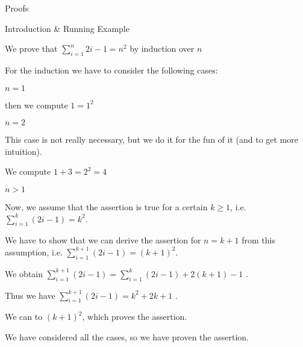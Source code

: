 \begin{sfragment}{Proofs}
\begin{sfragment}{Introduction \& Running Example}
\begin{mdframed}
  \begin{sproof}[id=simple-proof]
  {We prove that $\sum_{i=1}^n{2i-1}=n^{2}$ by induction over $n$}
  \begin{spfcases}{For the induction we have to consider the following cases:}
    \begin{spfcase}{$n=1$}
      \begin{spfstep}[type=inline] then we compute $1=1^2$\end{spfstep}
    \end{spfcase}
    \begin{spfcase}{$n=2$}
      \begin{spfcomment}[type=inline]
         This case is not really necessary, but we do it for the fun
         of it (and to get more intuition).
      \end{spfcomment}
      \begin{spfstep}[type=inline]
         We compute $1+3=2^{2}=4$
      \end{spfstep}
    \end{spfcase}
    \begin{spfcase}{$n>1$}
      \begin{spfstep}[type=hypothesis,id=ind-hyp]
        Now, we assume that the assertion is true for a certain $k\geq 1$, i.e.
        $\sum_{i=1}^k{(2i-1)}=k^{2}$.
      \end{spfstep}
      \begin{spfcomment}
        We have to show that we can derive the assertion for $n=k+1$ from this
        assumption, i.e.  $\sum_{i=1}^{k+1}{(2i-1)}=(k+1)^{2}$.
      \end{spfcomment}
      \begin{spfstep}[id=splitit]
        We obtain $\sum_{i=1}^{k+1}{(2i-1)}=\sum_{i=1}^k{(2i-1)}+2(k+1)-1$
       .
     \end{spfstep}
     \begin{spfstep}[id=byindhyp]
       Thus we have $\sum_{i=1}^{k+1}{(2i-1)}=k^2+2k+1$
       .
     \end{spfstep}
     \begin{spfstep}[type=conclusion]
       We can  to
       $(k+1)^2$, which proves the assertion.
     \end{spfstep}
   \end{spfcase}
   \begin{spfstep}[type=conclusion]
     We have considered all the cases, so we have proven the assertion.
   \end{spfstep}
  \end{spfcases}
\end{sproof}
\end{mdframed}


\end{sfragment}
\end{sfragment}
